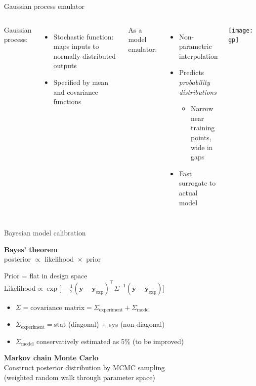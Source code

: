\documentclass{beamer}
\newcommand{\tran}{^\intercal}
\begin{document}
\begin{frame}{Gaussian process emulator}
  \vspace{1em}
  \begin{columns}[c]
    Gaussian process:
    \begin{itemize}
      \item Stochastic function: maps inputs to normally-distributed outputs
      \item Specified by mean and covariance functions
    \end{itemize}
    \bigskip
    As a model emulator:
    \begin{itemize}
      \item Non-parametric interpolation
      \item Predicts \emph{probability distributions}
        \begin{itemize}
          \item Narrow near training points, \\ wide in gaps
        \end{itemize}
      \item Fast surrogate to actual model
    \end{itemize}
    \texttt{[image: gp]}
  \end{columns}
\end{frame}

\newcommand{\ydiff}{(\mathbf y - \mathbf y_\text{exp})}

\begin{frame}{Bayesian model calibration}
  \begin{center}
    \textbf{Bayes' theorem} \\
    posterior ${}\propto{}$ likelihood ${}\times{}$ prior
  \end{center}
  Prior = flat in design space \\[1ex]
  Likelihood${} \propto \exp\bigl[ -\frac{1}{2} \ydiff\tran \Sigma^{-1} \ydiff \bigr]$ \\[.5ex]
  \begin{itemize}
    \item $\Sigma = \text{covariance matrix} = \Sigma_\text{experiment} + \Sigma_\text{model}$
    \item $\Sigma_\text{experiment} = {}$stat (diagonal) + sys (non-diagonal)
    \item $\Sigma_\text{model}$ conservatively estimated as 5\% (to be improved)
  \end{itemize}
  \begin{center}
    \textbf{Markov chain Monte Carlo} \\[1ex]
    Construct posterior distribution by MCMC sampling \\
    (weighted random walk through parameter space)
  \end{center}
\end{frame}
\end{document}
